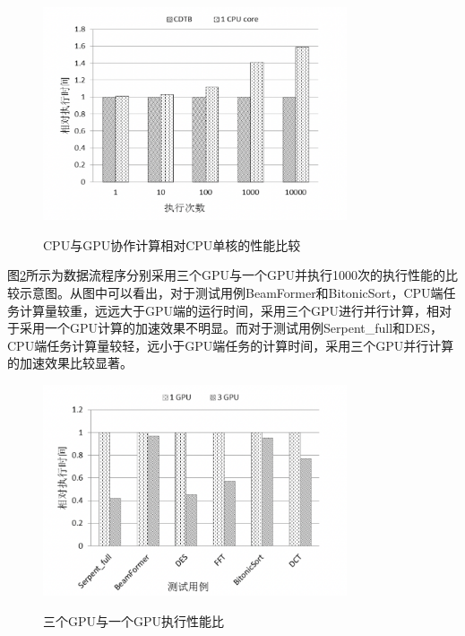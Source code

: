 \begin{figure}[htbp]
  \centering
  \includegraphics[width=0.8\textwidth]{Img/Chap_Application/Yu/cpugpu-cpu.png}\\
  \caption{CPU与GPU协作计算相对CPU单核的性能比较}\label{fig:cpugpu-cpu}
\end{figure}

图\ref{fig:3gpu-1gpu}所示为数据流程序分别采用三个GPU与一个GPU并执行1000次的执行性能的比较示意图。从图中可以看出，对于测试用例BeamFormer和BitonicSort，CPU端任务计算量较重，远远大于GPU端的运行时间，采用三个GPU进行并行计算，相对于采用一个GPU计算的加速效果不明显。而对于测试用例Serpent\_full和DES，CPU端任务计算量较轻，远小于GPU端任务的计算时间，采用三个GPU并行计算的加速效果比较显著。

\begin{figure}[htbp]
  \centering
  \includegraphics[width=0.8\textwidth]{Img/Chap_Application/Yu/3gpu-1gpu.png}\\
  \caption{三个GPU与一个GPU执行性能比}\label{fig:3gpu-1gpu}
\end{figure}

